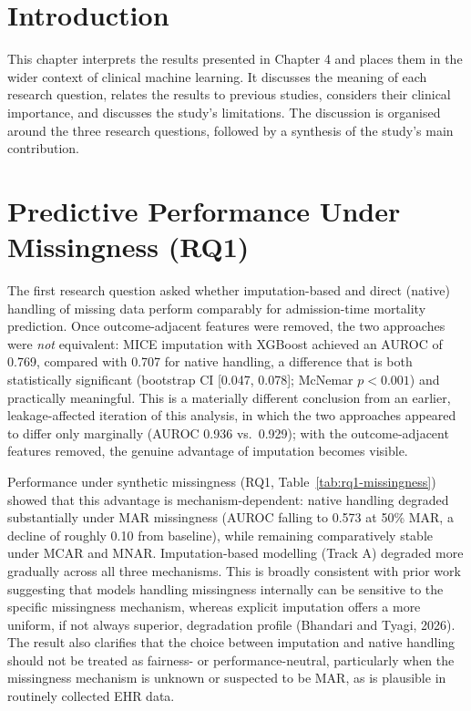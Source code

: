 \documentclass[12pt,a4paper]{report}
\begin{document}
\section{Introduction}
This chapter interprets the results presented in Chapter 4 and places them in the wider context of clinical machine learning. It discusses the meaning of each research question, relates the results to previous studies, considers their clinical importance, and discusses the study's limitations. The discussion is organised around the three research questions, followed by a synthesis of the study's main contribution.


\section{Predictive Performance Under Missingness (RQ1)}
The first research question asked whether imputation-based and direct (native) handling of missing data perform comparably for admission-time mortality prediction. Once outcome-adjacent features were removed, the two approaches were \emph{not} equivalent: MICE imputation with XGBoost achieved an AUROC of 0.769, compared with 0.707 for native handling, a difference that is both statistically significant (bootstrap CI [0.047, 0.078]; McNemar $p<0.001$) and practically meaningful. This is a materially different conclusion from an earlier, leakage-affected iteration of this analysis, in which the two approaches appeared to differ only marginally (AUROC 0.936 vs.\ 0.929); with the outcome-adjacent features removed, the genuine advantage of imputation becomes visible.

Performance under synthetic missingness (RQ1, Table~\ref{tab:rq1-missingness}) showed that this advantage is mechanism-dependent: native handling degraded substantially under MAR missingness (AUROC falling to 0.573 at 50\% MAR, a decline of roughly 0.10 from baseline), while remaining comparatively stable under MCAR and MNAR. Imputation-based modelling (Track A) degraded more gradually across all three mechanisms. This is broadly consistent with prior work suggesting that models handling missingness internally can be sensitive to the specific missingness mechanism, whereas explicit imputation offers a more uniform, if not always superior, degradation profile (Bhandari and Tyagi, 2026). The result also clarifies that the choice between imputation and native handling should not be treated as fairness- or performance-neutral, particularly when the missingness mechanism is unknown or suspected to be MAR, as is plausible in routinely collected EHR data.
\end{document}
